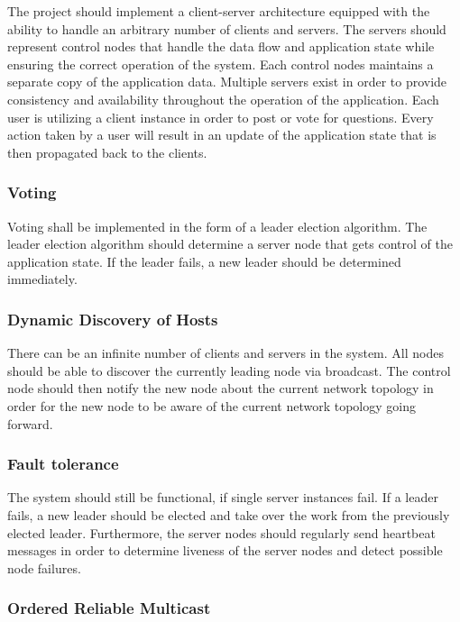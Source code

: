 \documentclass[runningheads]{llncs}
\begin{document}
The project should implement a client-server\cite{berson1996client} architecture equipped
with the ability to handle an arbitrary number of clients and servers. The
servers should represent control nodes that handle the data flow and application
state while ensuring the correct operation of the system. Each control nodes
maintains a separate copy of the application data. Multiple servers exist in
order to provide consistency and availability throughout the operation of the
application. Each user is utilizing a client instance in order to post or vote
for questions. Every action taken by a user will result in an update of the
application state that is then propagated back to the clients.

\subsubsection{Voting}

Voting shall be implemented in the form of a leader election algorithm. The leader
election algorithm should determine a server node that gets control
of the application state. If the leader fails, a new leader should be determined
immediately. 

\subsubsection{Dynamic Discovery of Hosts}

There can be an infinite number of clients and servers in the system. All nodes should
be able to discover the currently leading node via broadcast. The control node should then
notify the new node about the current network topology in order for the new node to be aware of the
current network topology going forward.

\subsubsection{Fault tolerance}

The system should still be functional, if single server instances fail. If a leader
fails, a new leader should be elected and take over the work from the previously
elected leader. Furthermore, the server nodes should regularly send heartbeat messages in order
to determine liveness of the server nodes and detect possible node failures.

\subsubsection{Ordered Reliable Multicast}
\end{document}
